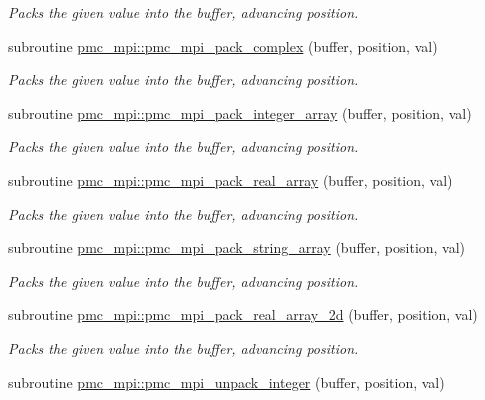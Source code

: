 \begin{DoxyCompactItemize}
\begin{DoxyCompactList}\small\item\em Packs the given value into the buffer, advancing position. \end{DoxyCompactList}\item 
subroutine \mbox{\hyperlink{namespacepmc__mpi_a5a62099ffca12da0a704c7882eae5a68}{pmc\+\_\+mpi\+::pmc\+\_\+mpi\+\_\+pack\+\_\+complex}} (buffer, position, val)
\begin{DoxyCompactList}\small\item\em Packs the given value into the buffer, advancing position. \end{DoxyCompactList}\item 
subroutine \mbox{\hyperlink{namespacepmc__mpi_a79337d426f7bb79e202bef5fa947399e}{pmc\+\_\+mpi\+::pmc\+\_\+mpi\+\_\+pack\+\_\+integer\+\_\+array}} (buffer, position, val)
\begin{DoxyCompactList}\small\item\em Packs the given value into the buffer, advancing position. \end{DoxyCompactList}\item 
subroutine \mbox{\hyperlink{namespacepmc__mpi_a1f4e3e18f2df01bd7b78fa8451ee5b71}{pmc\+\_\+mpi\+::pmc\+\_\+mpi\+\_\+pack\+\_\+real\+\_\+array}} (buffer, position, val)
\begin{DoxyCompactList}\small\item\em Packs the given value into the buffer, advancing position. \end{DoxyCompactList}\item 
subroutine \mbox{\hyperlink{namespacepmc__mpi_a6516aa6e9b139d7650cafce697c4caa8}{pmc\+\_\+mpi\+::pmc\+\_\+mpi\+\_\+pack\+\_\+string\+\_\+array}} (buffer, position, val)
\begin{DoxyCompactList}\small\item\em Packs the given value into the buffer, advancing position. \end{DoxyCompactList}\item 
subroutine \mbox{\hyperlink{namespacepmc__mpi_a505ef0d99feec94b21ea8b3f0011796d}{pmc\+\_\+mpi\+::pmc\+\_\+mpi\+\_\+pack\+\_\+real\+\_\+array\+\_\+2d}} (buffer, position, val)
\begin{DoxyCompactList}\small\item\em Packs the given value into the buffer, advancing position. \end{DoxyCompactList}\item 
subroutine \mbox{\hyperlink{namespacepmc__mpi_abc0278c39a8266c36d75d5801f4d8cf2}{pmc\+\_\+mpi\+::pmc\+\_\+mpi\+\_\+unpack\+\_\+integer}} (buffer, position, val)

\end{DoxyCompactItemize}
